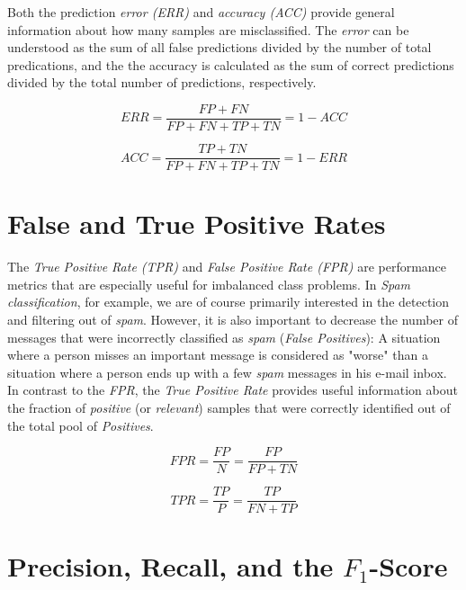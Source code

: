 \documentclass{article}
\begin{document}
Both the prediction \emph{error (ERR)} and \emph{accuracy (ACC)} provide general information about how many samples are misclassified. The \emph{error} can be understood as the sum of all false predictions divided by the number of total predications, and the the accuracy is calculated as the sum of correct predictions divided by the total number of predictions, respectively. 

\begin{equation} ERR = \frac{FP + FN}{FP+ FN + TP + TN} = 1-ACC\end{equation}

\begin{equation} ACC = \frac{TP + TN}{FP+ FN + TP + TN} = 1-ERR\end{equation}




\section{False and True Positive Rates}

The \emph{True Positive Rate (TPR)} and \emph{False Positive Rate (FPR)} are performance metrics that are especially useful for imbalanced class problems. In \emph{Spam classification}, for example, we are of course primarily interested in the detection and filtering out of \emph{spam}. However, it is also important to decrease the number of messages that were incorrectly classified as \emph{spam} (\emph{False Positives}): A situation where a person misses an important message is considered as "worse" than a situation where a person ends up with a few \emph{spam} messages in his e-mail inbox. In contrast to the \emph{FPR}, the \emph{True Positive Rate} provides useful information about the fraction of \emph{positive} (or \emph{relevant}) samples that were correctly identified out of the total pool of \emph{Positives}.

\begin{equation} FPR = \frac{FP}{N} =  \frac{FP}{FP + TN} \end{equation}

\begin{equation} TPR = \frac{TP}{P} =  \frac{TP}{FN + TP} \end{equation}


\section{Precision, Recall, and the $F_1$-Score}
\end{document}
